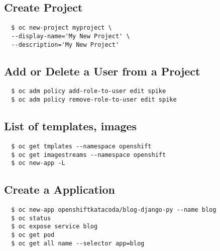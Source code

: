 \subsection{Create Project}
\begin{verbatim}
  $ oc new-project myproject \
  --display-name='My New Project' \
  --description='My New Project'
\end{verbatim}

\subsection{Add or Delete a User from a Project}
\begin{verbatim}
  $ oc adm policy add-role-to-user edit spike
  $ oc adm policy remove-role-to-user edit spike
\end{verbatim}

\subsection{List of templates, images}
\begin{verbatim}
  $ oc get tmplates --namespace openshift
  $ oc get imagestreams --namespace openshift
  $ oc new-app -L
\end{verbatim}

\subsection{Create a Application}
\begin{verbatim}
  $ oc new-app openshiftkatacoda/blog-django-py --name blog
  $ oc status
  $ oc expose service blog
  $ oc get pod
  $ oc get all name --selector app=blog
\end{verbatim}
